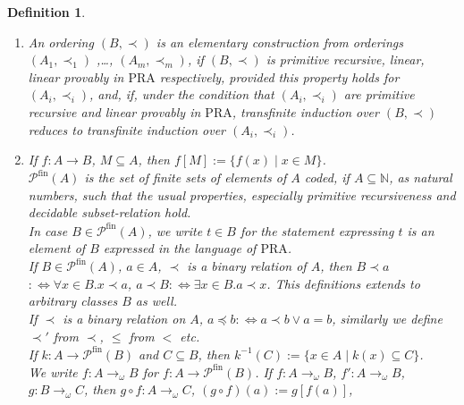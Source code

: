 \documentclass[10pt]{article}
\def \ssubitem#1{\item \label{\actlabel#1} }
\newtheorem {definition} [lemma]{Definition}
\def\all{\forall}
\def\ar{\rightarrow}
\def \Iff{\Leftrightarrow}
\def\nat{\mathbb{N}}
\def\potsetfin{{\mathcal{P}^\mathrm{fin}}}
\def\PRA{\mathrm{PRA}}
\def\underlinedef#1{{\it #1}}
\begin{document}
\begin{definition}
{\begin{enumerate}
formulas containing these predicates.
{\it Transfinite induction over $(\prec,A)$ is in ${\mathrm{PRA}}$ reducible to
transfinite induction over $(A_i,\prec_i)$} ($i=1 , \ldots , n$),
in short {\it ${\mathrm{TI}}_{(A,\prec)}$ is ${\mathrm{PRA}}$-reducible to
${\mathrm{TI}}_{(A_i,\prec_i)}$}, if 
there exist $n_i \in \mathbb{N}$, variables $z_{i,j,k}$,
classes $B_{i,j}$ with free variables $\subset 
\{ z_{i,j,1} ,\ldots, z_{i,j,m_{i,j}}\} $, such that
${\mathrm{PRA}^+} \vdash (\bigwedge_{i=1}^n \bigwedge_{j=1}^{n_i}
(\forall z_{ij1} ,\ldots, z_{ijm_{i,j}}.
{\mathrm{TI}}_{(A_i,\prec_i)}(B_{ij} ))
 \rightarrow {\mathrm{TI}}_{(A,\prec)}(Q)$ 
for some free unary predicate $Q$.
\ssubitem {ab} An ordering $(B,\prec)$ is an {\em elementary 
construction from orderings
$(A_1,\prec_1)$ ,\ldots,  $(A_m,\prec_m)$}, 
if $(B,\prec)$ is primitive recursive, linear,
linear provably in $\PRA$ respectively, provided  this property holds for 
$(A_i,\prec_i)$, and,
if, under the condition that $(A_i,\prec_i)$ are primitive recursive
and linear provably in $\PRA$, transfinite induction over
$(B,\prec)$ reduces to transfinite induction over $(A_i,\prec_i)$.
\ssubitem b 
If $f:A \ar B$, $M \subseteq A$, then 
\underlinedef{$f[M]$}$:= \{ f(x) \mid x \in M \} $.\\
\underlinedef{$\potsetfin(A)$} is 
the set of finite sets of elements of $A$ 
coded, if $A \subseteq \nat$, 
as natural numbers, such that the usual properties, especially 
primitive recursiveness and  decidable subset-relation hold.\\
In case $B \in \potsetfin(A)$, we write $t \in B$ for the
statement expressing $t$ is an element of $B$ expressed in
the language of $\PRA$.\\
If $B \in \potsetfin(A)$, $a \in A$, $\prec$ is
a binary relation of $A$, then
\underlinedef{$B \prec a$}$:\Iff \all x \in B.x \prec a$,
\underlinedef{$a \prec B$}$:\Iff \exists x \in B.a \prec x$.
This definitions extends to arbitrary classes $B$ as well.\\
If $\prec$ is a binary relation on $A$, 
\underlinedef{$a \preceq b$}$:\Iff
a \prec b \lor a = b$, similarly we define
$\prec '$ from $\prec$, $\leq$ from $<$ etc.\\
If $k: A \ar \potsetfin(B)$ and $C \subseteq B$, then
\underlinedef{$k^{-1}(C)$}$:= \{ x \in A \mid k(x) \subseteq C \} $.\\
We write \underlinedef{$f: A \ar_\omega B$} for $f: A \ar \potsetfin(B)$.
If $f: A \ar_\omega B$, $f': A \ar_\omega B$, $g:B \ar_\omega C$, 
then \underlinedef{$g \circ f$}$:A \ar_\omega C$, $(g \circ f)(a):= g[f(a)]$,

\end{enumerate}}
\end{definition}
\end{document}
